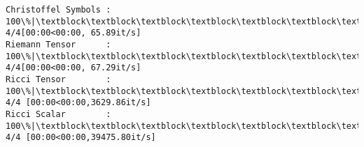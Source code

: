 \documentclass[11pt]{article}
\newcommand{\prompt}[4]{
        {\ttfamily\llap{{\color{#2}[#3]:\hspace{3pt}#4}}\vspace{-\baselineskip}}
    }
\begin{document}
    \begin{Verbatim}[commandchars=\\\{\}]
Christoffel Symbols : 100\%|\textblock\textblock\textblock\textblock\textblock\textblock\textblock\textblock\textblock\textblock\textblock\textblock\textblock\textblock\textblock\textblock\textblock\textblock\textblock\textblock\textblock\textblock\textblock\textblock\textblock\textblock\textblock\textblock\textblock\textblock\textblock\textblock\textblock\textblock\textblock| 4/4[00:00<00:00, 65.89it/s]
Riemann Tensor      : 100\%|\textblock\textblock\textblock\textblock\textblock\textblock\textblock\textblock\textblock\textblock\textblock\textblock\textblock\textblock\textblock\textblock\textblock\textblock\textblock\textblock\textblock\textblock\textblock\textblock\textblock\textblock\textblock\textblock\textblock\textblock\textblock\textblock\textblock\textblock\textblock| 4/4[00:00<00:00, 67.29it/s]
Ricci Tensor        : 100\%|\textblock\textblock\textblock\textblock\textblock\textblock\textblock\textblock\textblock\textblock\textblock\textblock\textblock\textblock\textblock\textblock\textblock\textblock\textblock\textblock\textblock\textblock\textblock\textblock\textblock\textblock\textblock\textblock\textblock\textblock\textblock\textblock\textblock| 4/4 [00:00<00:00,3629.86it/s]
Ricci Scalar        : 100\%|\textblock\textblock\textblock\textblock\textblock\textblock\textblock\textblock\textblock\textblock\textblock\textblock\textblock\textblock\textblock\textblock\textblock\textblock\textblock\textblock\textblock\textblock\textblock\textblock\textblock\textblock\textblock\textblock\textblock\textblock\textblock\textblock| 4/4 [00:00<00:00,39475.80it/s]
    \end{Verbatim}
 
            
\prompt{Out}{outcolor}{16}{}
    
\end{document}
